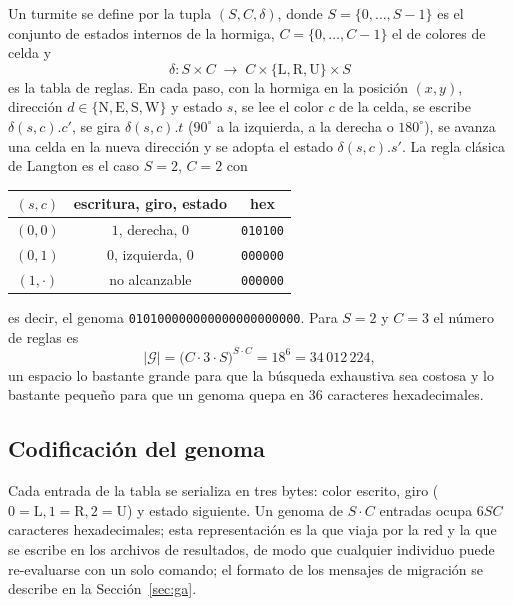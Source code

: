 \documentclass[11pt,a4paper]{article}
\begin{document}
Un turmite se define por la tupla $(S,C,\delta)$, donde $S=\{0,\dots,S-1\}$ es
el conjunto de estados internos de la hormiga, $C=\{0,\dots,C-1\}$ el de colores
de celda y
\begin{equation}
  \delta : S\times C \;\longrightarrow\; C\times\{\mathrm{L},\mathrm{R},\mathrm{U}\}\times S
\end{equation}
es la tabla de reglas.  En cada paso, con la hormiga en la posici\'on $(x,y)$,
direcci\'on $d\in\{\mathrm{N},\mathrm{E},\mathrm{S},\mathrm{W}\}$ y estado $s$,
se lee el color $c$ de la celda, se escribe $\delta(s,c).c'$, se gira
$\delta(s,c).t$ ($90^\circ$ a la izquierda, a la derecha o $180^\circ$), se
avanza una celda en la nueva direcci\'on y se adopta el estado
$\delta(s,c).s'$.  La regla cl\'asica de Langton es el caso $S=2$, $C=2$ con
\begin{center}
\begin{tabular}{ccc}
\toprule
$(s,c)$ & escritura, giro, estado & hex \\
\midrule
$(0,0)$ & $1$, derecha, $0$ & \texttt{010100} \\
$(0,1)$ & $0$, izquierda, $0$ & \texttt{000000} \\
$(1,\cdot)$ & no alcanzable & \texttt{000000} \\
\bottomrule
\end{tabular}
\end{center}
es decir, el genoma \texttt{010100000000000000000000}.  Para $S=2$ y $C=3$ el
n\'umero de reglas es
\begin{equation}
  |\mathcal{G}| = \bigl(C\cdot 3\cdot S\bigr)^{S\cdot C} = 18^{6} = 34\,012\,224,
\end{equation}
un espacio lo bastante grande para que la b\'usqueda exhaustiva sea costosa y lo
bastante peque\~no para que un genoma quepa en 36 caracteres hexadecimales.

\subsection{Codificaci\'on del genoma}

Cada entrada de la tabla se serializa en tres bytes: color escrito, giro
($0=\mathrm{L},1=\mathrm{R},2=\mathrm{U}$) y estado siguiente.  Un genoma de
$S\cdot C$ entradas ocupa $6SC$ caracteres hexadecimales; esta representaci\'on
es la que viaja por la red y la que se escribe en los archivos de resultados, de
modo que cualquier individuo puede re-evaluarse con un solo comando; el formato de los mensajes de migraci\'on se
describe en la Secci\'on~\ref{sec:ga}.
\end{document}
